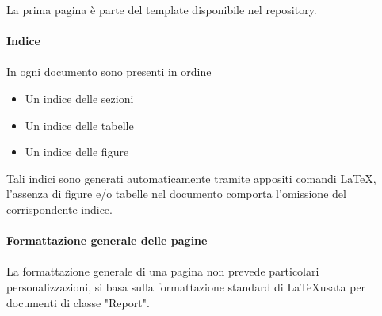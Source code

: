 \documentclass[a4paper]{report}
\begin{document}
					La prima pagina è parte del template disponibile nel repository. \\ \\
				\textbf{Indice} \\ \\
					In ogni documento sono presenti in ordine
					\begin{itemize}
						\item Un indice delle sezioni
						\item Un indice delle tabelle
						\item Un indice delle figure
					\end{itemize}
					Tali indici sono generati automaticamente tramite appositi comandi \LaTeX, l'assenza di figure 
					e/o tabelle nel documento comporta l'omissione del corrispondente indice. \\ \\
				\textbf{Formattazione generale delle pagine} \\ \\
					La formattazione generale di una pagina non prevede particolari personalizzazioni, si basa 
					sulla formattazione standard di \LaTeX \space usata per documenti di classe "Report". 
\end{document}
